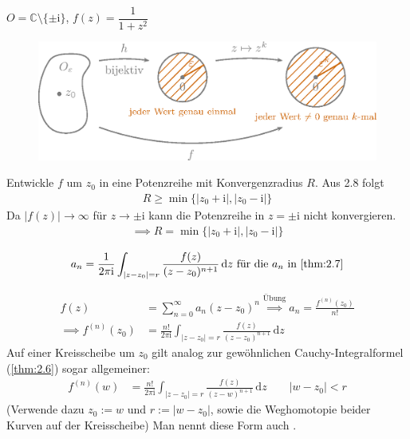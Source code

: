 \documentclass[a4paper,10pt]{scrbook}
\begin{document}
\begin{example}
  $O = \mathbb{C} \setminus \{ \pm \mathrm{i} \}$, $f(z) = \dfrac{1}{1+z^2}$

  \begin{figure}[H]
    \centering
    \includegraphics[scale=0.2]{images/ana3-tmp-18}
  \end{figure}

  Entwickle $f$ um $z_0$ in eine Potenzreihe mit Konvergenzradius $R$. Aus 2.8 folgt
  \begin{align*}
    R \geq \min \{ |z_0+\mathrm{i}|,|z_0-\mathrm{i}| \}
  \end{align*}
  Da $|f(z)| \to \infty$ für $z \to \pm \mathrm{i}$ kann die Potenzreihe in $z = \pm \mathrm{i}$ nicht konvergieren.
  \begin{align*}
    \implies R = \min \{ |z_0+\mathrm{i}|,|z_0-\mathrm{i}| \}
  \end{align*}
\end{example}


\begin{notice}[Folgerung] \label{thm:2.10}
  \begin{enum-arab}
    \item
    \begin{align*}
      a_n = \frac{1}{2 \pi \mathrm{i}} \int_{|z-z_0| = r} \frac{f(z)}{(z-z_0)^{n+1}} \, \mathrm{d}z \text{ für die $a_n$ in \ref{thm:2.7}}
    \end{align*}

    \item
    \begin{align*}
      f(z) &= \sum\limits_{n=0}^{\infty} a_n (z-z_0)^n \overset{\text{Übung}}{\implies} a_n = \frac{f^{(n)}(z_0)}{n!} \\
      \implies f^{(n)}(z_0) &= \frac{n!}{2 \pi \mathrm{i}} \int_{|z-z_0| = r} \frac{f(z)}{(z-z_0)^{n+1}} \, \mathrm{d}z
    \end{align*}
    Auf einer Kreisscheibe um $z_0$ gilt analog zur gewöhnlichen Cauchy-Integralformel (\ref{thm:2.6}) sogar allgemeiner:
    \begin{align*}
      f^{(n)}(w) &= \frac{n!}{2 \pi \mathrm{i}} \int_{|z-z_0| = r} \frac{f(z)}{(z-w)^{n+1}} \, \mathrm{d}z \qquad |w-z_0|<r
    \end{align*}
    (Verwende dazu $z_0 := w$ und $r := |w-z_0|$, sowie die Weghomotopie beider Kurven auf der Kreisscheibe)
    Man nennt diese Form auch .
  \end{enum-arab}
\end{notice}
\end{document}
